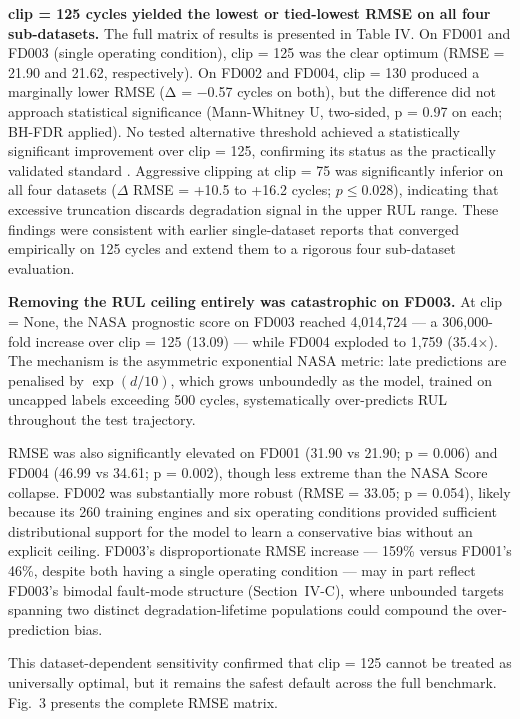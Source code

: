 \documentclass[preprint,10pt]{elsarticle}
\begin{document}
\textbf{clip = 125 cycles yielded the lowest or tied-lowest RMSE on all four sub-datasets.} The full matrix of results is presented in Table IV. On FD001 and FD003 (single operating condition), clip = 125 was the clear optimum (RMSE = 21.90 and 21.62, respectively). On FD002 and FD004, clip = 130 produced a marginally lower RMSE (Δ = −0.57 cycles on both), but the difference did not approach statistical significance (Mann-Whitney U, two-sided, p = 0.97 on each; BH-FDR applied). No tested alternative threshold achieved a statistically significant improvement over clip = 125, confirming its status as the practically validated standard \cite{ref05,ref06}. Aggressive clipping at clip = 75 was significantly inferior on all four datasets ($\Delta$ RMSE = +10.5 to +16.2 cycles; $p \leq 0.028$), indicating that excessive truncation discards degradation signal in the upper RUL range. These findings were consistent with earlier single-dataset reports that converged empirically on 125 cycles \cite{ref05,ref06} and extend them to a rigorous four sub-dataset evaluation.

\textbf{Removing the RUL ceiling entirely was catastrophic on FD003.} At clip = None, the NASA prognostic score on FD003 reached 4,014,724 --- a 306,000-fold increase over clip = 125 (13.09) --- while FD004 exploded to 1,759 (35.4$\times$). The mechanism is the asymmetric exponential NASA metric: late predictions are penalised by $\exp(d/10)$, which grows unboundedly as the model, trained on uncapped labels exceeding 500 cycles, systematically over-predicts RUL throughout the test trajectory.

RMSE was also significantly elevated on FD001 (31.90 vs 21.90; p = 0.006) and FD004 (46.99 vs 34.61; p = 0.002), though less extreme than the NASA Score collapse. FD002 was substantially more robust (RMSE = 33.05; p = 0.054), likely because its 260 training engines and six operating conditions provided sufficient distributional support for the model to learn a conservative bias without an explicit ceiling. FD003's disproportionate RMSE increase --- 159\% versus FD001's 46\%, despite both having a single operating condition --- may in part reflect FD003's bimodal fault-mode structure (Section~IV-C), where unbounded targets spanning two distinct degradation-lifetime populations could compound the over-prediction bias.

This dataset-dependent sensitivity confirmed that clip = 125 cannot be treated as universally optimal, but it remains the safest default across the full benchmark. Fig.~3 presents the complete RMSE matrix.
\end{document}
